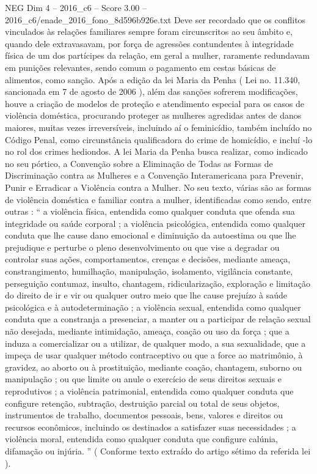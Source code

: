 \begin{textsample}{NEG Dim 4 – 2016\_c6 – Score 3.00 – 2016\_c6/enade\_2016\_fono\_8d596b926e.txt}
Deve ser recordado que os conflitos vinculados às relações familiares sempre foram circunscritos ao seu âmbito e, quando dele extravasavam, por força de agressões contundentes à integridade física de um dos partícipes da relação, em geral a mulher, raramente redundavam em punições relevantes, sendo comum o pagamento em cestas básicas de alimentos, como sanção.
Após a edição da lei Maria da Penha ( Lei no. 11.340, sancionada em 7 de agosto de 2006 ), além das sanções sofrerem modificações, houve a criação de modelos de proteção e atendimento especial para os casos de violência doméstica, procurando proteger as mulheres agredidas antes de danos maiores, muitas vezes irreversíveis, incluindo aí o feminicídio, também incluído no Código Penal, como circunstância qualificadora do crime de homicídio, e incluí -lo no rol dos crimes hediondos.
A lei Maria da Penha busca realizar, como indicado no seu pórtico, a Convenção sobre a Eliminação de Todas as Formas de Discriminação contra as Mulheres e a Convenção Interamericana para Prevenir, Punir e Erradicar a Violência contra a Mulher.
No seu texto, várias são as formas de violência doméstica e familiar contra a mulher, identificadas como sendo, entre outras : “ a violência física, entendida como qualquer conduta que ofenda sua integridade ou saúde corporal ; a violência psicológica, entendida como qualquer conduta que lhe cause dano emocional e diminuição da autoestima ou que lhe prejudique e perturbe o pleno desenvolvimento ou que vise a degradar ou controlar suas ações, comportamentos, crenças e decisões, mediante ameaça, constrangimento, humilhação, manipulação, isolamento, vigilância constante, perseguição contumaz, insulto, chantagem, ridicularização, exploração e limitação do direito de ir e vir ou qualquer outro meio que lhe cause prejuízo à saúde psicológica e à autodeterminação ; a violência sexual, entendida como qualquer conduta que a constranja a presenciar, a manter ou a participar de relação sexual não desejada, mediante intimidação, ameaça, coação ou uso da força ; que a induza a comercializar ou a utilizar, de qualquer modo, a sua sexualidade, que a impeça de usar qualquer método contraceptivo ou que a force ao matrimônio, à gravidez, ao aborto ou à prostituição, mediante coação, chantagem, suborno ou manipulação ; ou que limite ou anule o exercício de seus direitos sexuais e reprodutivos ; a violência patrimonial, entendida como qualquer conduta que configure retenção, subtração, destruição parcial ou total de seus objetos, instrumentos de trabalho, documentos pessoais, bens, valores e direitos ou recursos econômicos, incluindo os destinados a satisfazer suas necessidades ; a violência moral, entendida como qualquer conduta que configure calúnia, difamação ou injúria. ” ( Conforme texto extraído do artigo sétimo da referida lei ).

\end{textsample}
